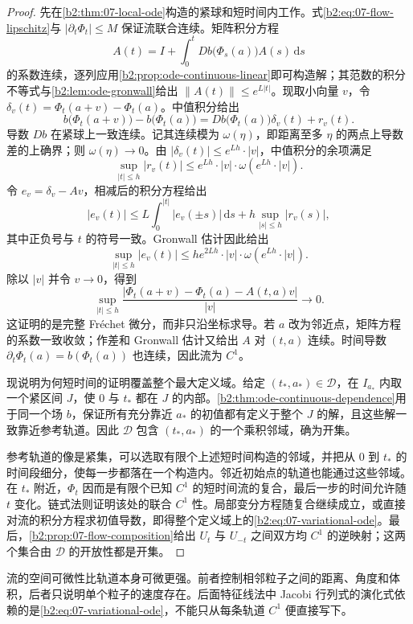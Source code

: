 \begin{proof}
先在\cref{b2:thm:07-local-ode}构造的紧球和短时间内工作。式\eqref{b2:eq:07-flow-lipschitz}与 \(|\partial_t\Phi_t|\leq M\) 保证流联合连续。矩阵积分方程
\[
 A(t)=I+\int_0^t Db\bigl(\Phi_s(a)\bigr)A(s)\,\mathrm ds
\]
的系数连续，逐列应用\cref{b2:prop:ode-continuous-linear}即可构造解；其范数的积分不等式与\cref{b2:lem:ode-gronwall}给出 \(\|A(t)\|\leq e^{L|t|}\)。现取小向量 \(v\)，令 \(\delta_v(t)=\Phi_t(a+v)-\Phi_t(a)\)。中值积分给出
\[
 b\bigl(\Phi_t(a+v)\bigr)-b\bigl(\Phi_t(a)\bigr)
 =Db\bigl(\Phi_t(a)\bigr)\delta_v(t)+r_v(t).
\]
导数 \(Db\) 在紧球上一致连续。记其连续模为 \(\omega(\eta)\)，即距离至多 \(\eta\) 的两点上导数差的上确界；则 \(\omega(\eta)\to0\)。由 \(|\delta_v(t)|\leq e^{Lh}\cdot|v|\)，中值积分的余项满足
\[
 \sup_{|t|\leq h}|r_v(t)|
 \leq e^{Lh}\cdot|v|\cdot\omega(e^{Lh}\cdot|v|).
\]
令 \(e_v=\delta_v-Av\)，相减后的积分方程给出
\[
 |e_v(t)|\leq L\int_0^{|t|}|e_v(\pm s)|\,\mathrm ds
              +h\sup_{|s|\leq h}|r_v(s)|,
\]
其中正负号与 \(t\) 的符号一致。Gronwall 估计因此给出
\[
 \sup_{|t|\leq h}|e_v(t)|
 \leq h e^{2Lh}\cdot|v|\cdot\omega(e^{Lh}\cdot|v|).
\]
除以 \(|v|\) 并令 \(v\to0\)，得到
\[
 \sup_{|t|\leq h}
 \frac{|\Phi_t(a+v)-\Phi_t(a)-A(t,a)v|}{|v|}\longrightarrow0.
\]
这证明的是完整 Fréchet 微分，而非只沿坐标求导。若 \(a\) 改为邻近点，矩阵方程的系数一致收敛；作差和 Gronwall 估计又给出 \(A\) 对 \((t,a)\) 连续。时间导数 \(\partial_t\Phi_t(a)=b(\Phi_t(a))\) 也连续，因此流为 \(C^1\)。

现说明为何短时间的证明覆盖整个最大定义域。给定 \((t_*,a_*)\in\mathcal D\)，在 \(I_{a_*}\) 内取一个紧区间 \(J\)，使 \(0\) 与 \(t_*\) 都在 \(J\) 的内部。\cref{b2:thm:ode-continuous-dependence}用于同一个场 \(b\)，保证所有充分靠近 \(a_*\) 的初值都有定义于整个 \(J\) 的解，且这些解一致靠近参考轨道。因此 \(\mathcal D\) 包含 \((t_*,a_*)\) 的一个乘积邻域，确为开集。

参考轨道的像是紧集，可以选取有限个上述短时间构造的邻域，并把从 \(0\) 到 \(t_*\) 的时间段细分，使每一步都落在一个构造内。邻近初始点的轨道也能通过这些邻域。在 \(t_*\) 附近，\(\Phi_t\) 因而是有限个已知 \(C^1\) 的短时间流的复合，最后一步的时间允许随 \(t\) 变化。链式法则证明该处的联合 \(C^1\) 性。局部变分方程随复合继续成立，或直接对流的积分方程求初值导数，即得整个定义域上的\eqref{b2:eq:07-variational-ode}。最后，\cref{b2:prop:07-flow-composition}给出 \(U_t\) 与 \(U_{-t}\) 之间双方均 \(C^1\) 的逆映射；这两个集合由 \(\mathcal D\) 的开放性都是开集。
\end{proof}

流的空间可微性比轨道本身可微更强。前者控制相邻粒子之间的距离、角度和体积，后者只说明单个粒子的速度存在。后面特征线法中 Jacobi 行列式的演化式依赖的是\eqref{b2:eq:07-variational-ode}，不能只从每条轨道 \(C^1\) 便直接写下。

